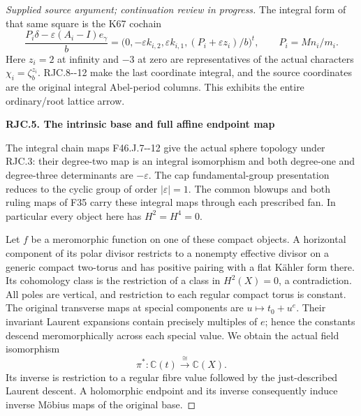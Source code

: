 \begin{proof}[Supplied source argument; continuation review in progress]
The integral form of that same square is the K67 cochain
\[
 \frac{P_i\delta-\varepsilon(A_i-I)e_\gamma}{b}
 =\bigl(0,-\varepsilon k_{i,2},\varepsilon k_{i,1},
                (P_i+\varepsilon z_i)/b\bigr)^t,\qquad
 P_i=Mn_i/m_i.
 \tag{RJC.41}
\]
Here \(z_i=2\) at infinity and \(-3\) at zero are representatives
of the actual characters \(\chi_i=\zeta_b^{z_i}\).
RJC.8-\/-12 make the last coordinate integral, and the source
coordinates are the original integral Abel-period columns.
This exhibits the entire ordinary/root lattice arrow.

\par

\medskip\noindent\textbf{RJC.5. The intrinsic base and full affine endpoint map}

\par\nobreak

The integral chain maps F46.J.7-\/-12 give the actual sphere
topology under RJC.3: their degree-two map is an integral
isomorphism and both degree-one and degree-three determinants
are \(-\varepsilon\). The cap fundamental-group presentation
reduces to the cyclic group of order \(|\varepsilon|=1\).
The common blowups and both ruling maps of F35 carry these
integral maps through each prescribed fan. In particular every
object here has \(H^2=H^4=0\).

Let \(f\) be a meromorphic function on one of these compact
objects. A horizontal component of its polar divisor restricts
to a nonempty effective divisor on a generic compact two-torus
and has positive pairing with a flat Kähler form there.
Its cohomology class is the restriction of a class in
\(H^2(X)=0\), a contradiction. All poles are vertical, and
restriction to each regular compact torus is constant.
The original transverse maps at special components are
\(u\mapsto t_0+u^e\). Their invariant Laurent expansions
contain precisely multiples of \(e\); hence the constants
descend meromorphically across each special value. We obtain
the actual field isomorphism
\[
 \pi^*:\mathbb C(t)\xrightarrow{\;\cong\;}\mathbb C(X).
 \tag{RJC.42}
\]
Its inverse is restriction to a regular fibre value followed
by the just-described Laurent descent. A holomorphic endpoint
and its inverse consequently induce inverse Möbius maps of
the original base.


\end{proof}
